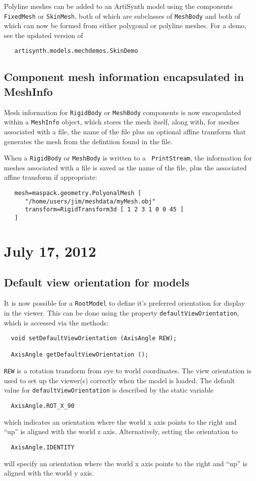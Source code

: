\documentclass{article}
\begin{document}
Polyline meshes can be added to an ArtiSynth model using the
components {\tt FixedMesh} or {\tt SkinMesh}, both of which are
subclasses of {\tt MeshBody} and both of which can now be formed from
either polygonal or polyline meshes.  For a demo, see the updated
version of
\begin{verbatim}
   artisynth.models.mechdemos.SkinDemo
\end{verbatim}

\subsection*{Component mesh information encapsulated in MeshInfo}

Mesh information for {\tt RigidBody} or {\tt MeshBody} components is
now encapsulated within a {\tt MeshInfo} object, which stores the mesh
itself, along with, for meshes associated with a file, the name of the
file plus an optional affine transform that generates the mesh from
the defintiion found in the file.

When a {\tt RigidBody} or {\tt MeshBody} is written to a {\tt
PrintStream}, the information for meshes associated with a file is
saved as the name of the file, plus the associated affine transform if
appropriate:
\begin{lstlisting}
   mesh=maspack.geometry.PolyonalMesh [
      "/home/users/jim/meshdata/myMesh.obj"
      transform=RigidTransform3d [ 1 2 3 1 0 0 45 ]
   ]
\end{lstlisting}

\section*{July 17, 2012}

\subsection*{Default view orientation for models}

It is now possible for a {\tt RootModel} to define it's preferred
orientation for display in the viewer. This can be done using the
property {\tt defaultViewOrientation}, which is accessed
via the methods:
\begin{verbatim}
  void setDefaultViewOrientation (AxisAngle REW);

  AxisAngle getDefaultViewOrientation ();
\end{verbatim}
{\tt REW} is a rotation transform from eye to world coordinates.  The
view orientation is used to set up the viewer(s) correctly when the
model is loaded. The default value for {\tt defaultViewOrientation} is
described by the static variable
\begin{verbatim}
  AxisAngle.ROT_X_90
\end{verbatim}
which indicates an orientation where the world x axis points to the 
right and ``up'' is aligned with the world z axis. Alternatively,
setting the orientation to 
\begin{verbatim}
  AxisAngle.IDENTITY
\end{verbatim}
will specify an orientation where the world x axis points to the
right and ``up'' is aligned with the world y axis.
\end{document}
